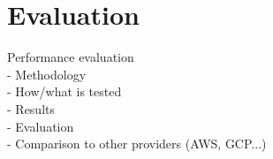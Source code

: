 \chapter{Evaluation}
\label{chapter:evaluation}

Performance evaluation \\
- Methodology \\
- How/what is tested \\
- Results \\
- Evaluation \\
- Comparison to other providers (AWS, GCP...) \\
 
